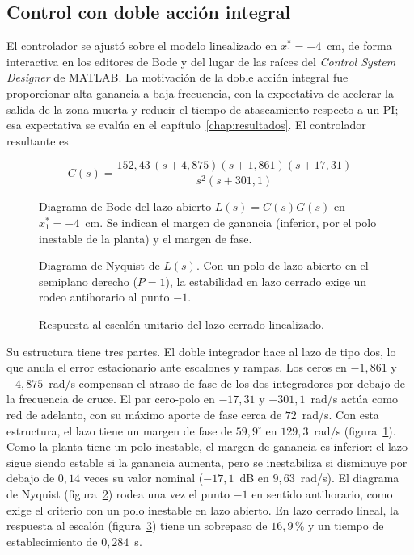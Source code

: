 

\subsection{Control con doble acción integral}
\label{sec:pii}
El controlador se ajustó sobre el modelo linealizado en $x_1^*=-4$~cm, de forma interactiva en los editores de Bode y del lugar de las raíces del \emph{Control System Designer} de MATLAB. La motivación de la doble acción integral fue proporcionar alta ganancia a baja frecuencia, con la expectativa de acelerar la salida de la zona muerta y reducir el tiempo de atascamiento respecto a un PI; esa expectativa se evalúa en el capítulo~\ref{chap:resultados}. El controlador resultante es

\[
C(s)=\frac{152{,}43\,(s+4{,}875)(s+1{,}861)(s+17{,}31)}
{s^{2}(s+301{,}1)}
\]

\begin{figure}[ht]
    \centering
    
    \caption[Diagrama de Bode]{Diagrama de Bode del lazo abierto $L(s)=C(s)G(s)$ en $x_1^*=-4$~cm. Se indican el margen de ganancia (inferior, por el polo inestable de la planta) y el margen de fase.}
    \label{bode_fase}
\end{figure}

\begin{figure}[ht]
    \centering
    
    \caption[Diagrama de Nyquist]{Diagrama de Nyquist de $L(s)$. Con un polo de lazo abierto en el semiplano derecho ($P=1$), la estabilidad en lazo cerrado exige un rodeo antihorario al punto $-1$.}
    \label{nyquist}
\end{figure}

\begin{figure}[ht]
    \centering
    
    \caption[Respuesta al escalón]{Respuesta al escalón unitario del lazo cerrado linealizado.}
    \label{step_response}
\end{figure}

Su estructura tiene tres partes. El doble integrador hace al lazo de tipo dos, lo que anula el error estacionario ante escalones y rampas. Los ceros en $-1{,}861$ y $-4{,}875$~rad/s compensan el atraso de fase de los dos integradores por debajo de la frecuencia de cruce. El par cero-polo en $-17{,}31$ y $-301{,}1$~rad/s actúa como red de adelanto, con su máximo aporte de fase cerca de $72$~rad/s. Con esta estructura, el lazo tiene un margen de fase de $59{,}9^\circ$ en $129{,}3$~rad/s (figura~\ref{bode_fase}). Como la planta tiene un polo inestable, el margen de ganancia es inferior: el lazo sigue siendo estable si la ganancia aumenta, pero se inestabiliza si disminuye por debajo de $0{,}14$ veces su valor nominal ($-17{,}1$~dB en $9{,}63$~rad/s). El diagrama de Nyquist (figura~\ref{nyquist}) rodea una vez el punto $-1$ en sentido antihorario, como exige el criterio con un polo inestable en lazo abierto. En lazo cerrado lineal, la respuesta al escalón (figura~\ref{step_response}) tiene un sobrepaso de $16{,}9$\,\% y un tiempo de establecimiento de $0{,}284$~s.    

\FloatBarrier
\newpage


